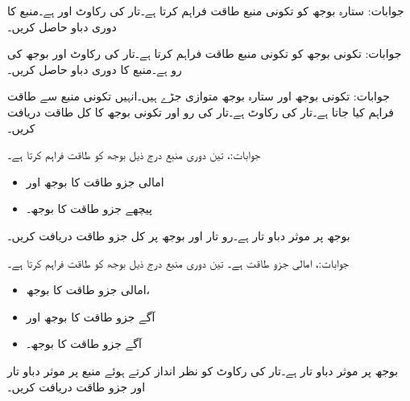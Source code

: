 جوابات:
ستارہ بوجھ  کو تکونی  منبع طاقت فراہم  کرتا ہے۔تار کی رکاوٹ  اور  ہے۔منبع کا دوری دباو حاصل کریں۔

جوابات:
تکونی بوجھ  کو تکونی  منبع طاقت فراہم  کرتا ہے۔تار کی رکاوٹ  اور بوجھ کی رو 
  ہے۔منبع کا دوری دباو حاصل کریں۔

جوابات:
تکونی بوجھ   اور ستارہ بوجھ  متوازی جڑے ہیں۔انہیں تکونی منبع  سے طاقت فراہم کیا جاتا ہے۔تار کی رکاوٹ  ہے۔تار کی رو اور تکونی بوجھ کا کل طاقت دریافت کریں۔

جوابات:، 
تین دوری  منبع درج ذیل بوجھ کو طاقت فراہم کرتا ہے۔
\begin{itemize}
\item
{} امالی جزو طاقت کا  بوجھ اور
\item
{} پیچھے جزو طاقت کا  بوجھ۔
\end{itemize}
بوجھ پر موثر دباو تار  ہے۔رو تار اور بوجھ پر کل جزو طاقت دریافت کریں۔

جوابات:، امالی جزو طاقت  ہے۔
تین دوری  منبع درج ذیل بوجھ کو طاقت فراہم کرتا ہے۔
\begin{itemize}
\item
{} امالی جزو طاقت کا  بوجھ،
\item
{} آگے جزو طاقت کا  بوجھ اور
\item
{} آگے جزو طاقت کا  بوجھ۔
\end{itemize}
بوجھ پر موثر دباو تار  ہے۔تار کی رکاوٹ کو نظر انداز کرتے ہوئے منبع پر موثر دباو تار اور جزو طاقت دریافت کریں۔

